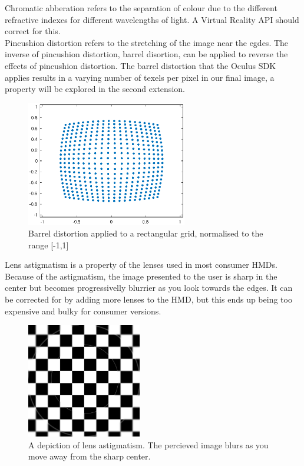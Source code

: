 \documentclass[12pt,a4paper,twoside,openright]{report}
\begin{document}
Chromatic abberation refers to the separation of colour due to the different refractive indexes for different wavelengths of light. A Virtual Reality API should correct for this.\\

Pincushion distortion refers to the stretching of the image near the egdes. The inverse of pincushion distortion, barrel disortion, can be applied to reverse the effects of pincushion distortion. The barrel distortion that the Oculus SDK applies results in a varying number of texels per pixel in our final image, a property will be explored in the second extension.


\begin{figure}
\centerline{\includegraphics[width=7cm]{figs/post_distortion.eps}}
\caption{Barrel distortion applied to a rectangular grid, normalised to the range [-1,1]}
\end{figure}

Lens astigmatism is a property of the lenses used in most consumer HMDs. Because of the astigmatism, the image presented to the user is sharp in the center but becomes progressivelly blurrier as you look towards the edges.  It can be corrected for by adding more lenses to the HMD, but this ends up being too expensive and bulky for consumer versions.

\begin{figure}
\centerline{\includegraphics[width=5cm]{figs/blur.png}}
\caption{A depiction of lens astigmatism. The percieved image blurs as you move away from the sharp center.}
\label{blurred}
\end{figure}
\end{document}
